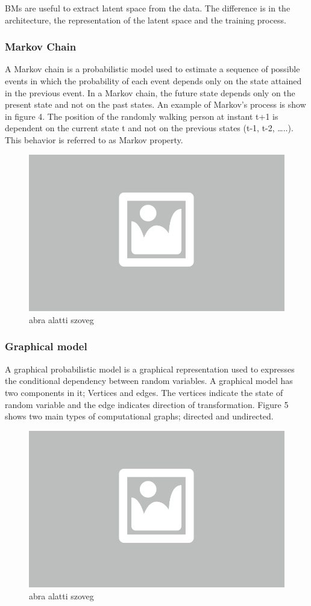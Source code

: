 BMs are useful to extract latent space from the data. The difference is in the architecture, the representation of the latent space and the training process. 

\subsubsection{Markov Chain}

A Markov chain is a probabilistic model used to estimate a sequence of possible events in which the probability of each event depends only on the state attained in the previous event.  In a Markov chain, the future state depends only on the present state and not on the past states. An example of Markov’s process is show in figure 4.  The position of the randomly walking person at instant t+1 is dependent on the current state t and not on the previous states (t-1, t-2, …..). This behavior is referred to as Markov property.

\begin{figure}[h]
	\centering
	\includegraphics[width=0.65\columnwidth]{figures/abra.png}
	\caption{abra alatti szoveg}
\end{figure}


\subsubsection{Graphical model}

A graphical probabilistic model is a graphical representation used to expresses the conditional dependency between random variables. A graphical model has two components in it; Vertices and edges. The vertices indicate the state of random variable and the edge indicates direction of transformation. Figure 5 shows two main types of computational graphs; directed and undirected.

\begin{figure}[h]
	\centering
	\includegraphics[width=0.65\columnwidth]{figures/abra.png}
	\caption{abra alatti szoveg}
\end{figure}

